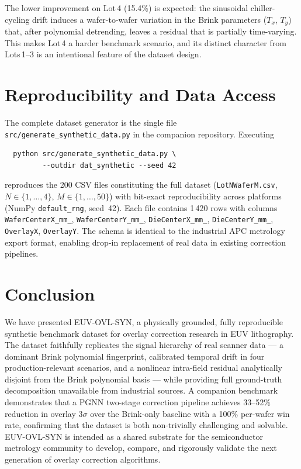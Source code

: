 \documentclass[10pt,conference]{IEEEtran}
\begin{document}
The lower improvement on Lot\,4 (15.4\%) is expected: the sinusoidal
chiller-cycling drift induces a wafer-to-wafer variation in the Brink
parameters ($T_x$, $T_y$) that, after polynomial detrending, leaves a
residual that is partially time-varying.  This makes Lot\,4 a harder
benchmark scenario, and its distinct character from Lots\,1–3 is an
intentional feature of the dataset design.

\section{Reproducibility and Data Access}

The complete dataset generator is the single file
\texttt{src/generate\_synthetic\_data.py} in the companion repository.
Executing

\vspace{-2pt}
\begin{verbatim}
  python src/generate_synthetic_data.py \
         --outdir dat_synthetic --seed 42
\end{verbatim}

\vspace{-2pt}
\noindent reproduces the 200 CSV files constituting the full dataset
(\texttt{LotNWaferM.csv}, $N\in\{1,\ldots,4\}$, $M\in\{1,\ldots,50\}$) with
bit-exact reproducibility across platforms (NumPy \texttt{default\_rng},
seed~42).  Each file contains 1\,420 rows with columns
\texttt{WaferCenterX\_mm\_}, \texttt{WaferCenterY\_mm\_},
\texttt{DieCenterX\_mm\_}, \texttt{DieCenterY\_mm\_},
\texttt{OverlayX}, \texttt{OverlayY}.
The schema is identical to the industrial APC metrology export format,
enabling drop-in replacement of real data in existing correction pipelines.

\section{Conclusion}

We have presented \textsc{EUV-OVL-SYN}, a physically grounded, fully
reproducible synthetic benchmark dataset for overlay correction research
in EUV lithography.  The dataset faithfully replicates the signal hierarchy
of real scanner data — a dominant Brink polynomial fingerprint, calibrated
temporal drift in four production-relevant scenarios, and a nonlinear
intra-field residual analytically disjoint from the Brink polynomial basis —
while providing full ground-truth decomposition unavailable from industrial
sources.  A companion benchmark demonstrates that a PGNN two-stage
correction pipeline achieves 33–52\% reduction in overlay $3\sigma$ over
the Brink-only baseline with a 100\% per-wafer win rate, confirming that
the dataset is both non-trivially challenging and solvable.
\textsc{EUV-OVL-SYN} is intended as a shared substrate for the
semiconductor metrology community to develop, compare, and rigorously
validate the next generation of overlay correction algorithms.
\end{document}
